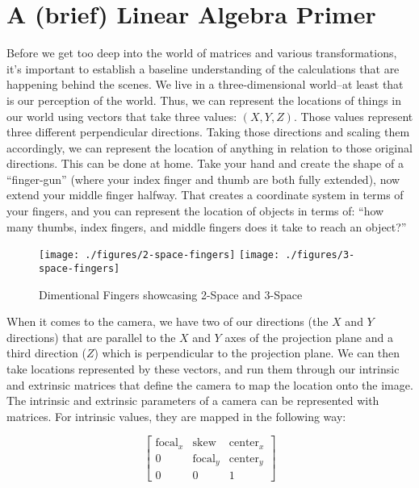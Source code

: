 \documentclass[12pt,twoside]{reedthesis}
\begin{document}
\section{A (brief) Linear Algebra Primer}
Before we get too deep into the world of matrices and various transformations, it’s important to establish a baseline understanding of the calculations that are happening behind the scenes. We live in a three-dimensional world–at least that is our perception of the world. Thus, we can represent the locations of things in our world using vectors that take three values: $(X, Y, Z)$. Those values represent three different perpendicular directions. Taking those directions and scaling them accordingly, we can represent the location of anything in relation to those original directions. This can be done at home. Take your hand and create the shape of a “finger-gun” (where your index finger and thumb are both fully extended), now extend your middle finger halfway. That creates a coordinate system in terms of your fingers, and you can represent the location of objects in terms of: “how many thumbs, index fingers, and middle fingers does it take to reach an object?”

\begin{figure}[h]
	   
	       \centering
	    
	    \texttt{[image: ./figures/2-space-fingers]} 
		\hfill	    
	    \texttt{[image: ./figures/3-space-fingers]}
	     \caption{Dimentional Fingers showcasing 2-Space and 3-Space}
	 \label{Dimentional Fingers}
	\end{figure}

When it comes to the camera, we have two of our directions (the $X$ and $Y$ directions) that are parallel to the $X$ and $Y$ axes of the projection plane and a third direction ($Z$) which is perpendicular to the projection plane. We can then take locations represented by these vectors, and run them through our intrinsic and extrinsic matrices that define the camera to map the location onto the image. The intrinsic and extrinsic parameters of a camera can be represented with matrices. For intrinsic values, they are mapped in the following way:

\[\begin{bmatrix}
\text{focal}_x & \text{skew} & \text{center}_x \\
0 & \text{focal}_y & \text{center}_y \\
0 & 0 & 1
\end{bmatrix}\]
\end{document}
